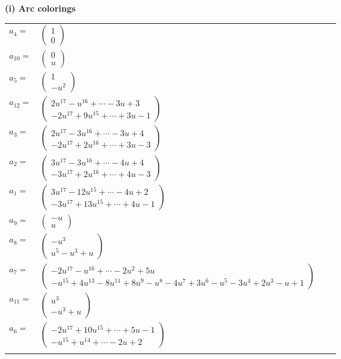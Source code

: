 \documentclass[1p]{elsarticle_modified}
\theoremstyle{definition}
\begin{document}
\flushleft \textbf{(i) Arc colorings}\\
\begin{tabular}{m{7pt} m{180pt} m{7pt} m{180pt} }
\flushright $a_{4}=$&$\begin{pmatrix}1\\0\end{pmatrix}$ \\
\flushright $a_{10}=$&$\begin{pmatrix}0\\u\end{pmatrix}$ \\
\flushright $a_{5}=$&$\begin{pmatrix}1\\- u^2\end{pmatrix}$ \\
\flushright $a_{12}=$&$\begin{pmatrix}2 u^{17}- u^{16}+\cdots-3 u+3\\-2 u^{17}+9 u^{15}+\cdots+3 u-1\end{pmatrix}$ \\
\flushright $a_{3}=$&$\begin{pmatrix}2 u^{17}-3 u^{16}+\cdots-3 u+4\\-2 u^{17}+2 u^{16}+\cdots+3 u-3\end{pmatrix}$ \\
\flushright $a_{2}=$&$\begin{pmatrix}3 u^{17}-3 u^{16}+\cdots-4 u+4\\-3 u^{17}+2 u^{16}+\cdots+4 u-3\end{pmatrix}$ \\
\flushright $a_{1}=$&$\begin{pmatrix}3 u^{17}-12 u^{15}+\cdots-4 u+2\\-3 u^{17}+13 u^{15}+\cdots+4 u-1\end{pmatrix}$ \\
\flushright $a_{9}=$&$\begin{pmatrix}- u\\u\end{pmatrix}$ \\
\flushright $a_{8}=$&$\begin{pmatrix}- u^3\\u^5- u^3+u\end{pmatrix}$ \\
\flushright $a_{7}=$&$\begin{pmatrix}-2 u^{17}- u^{16}+\cdots-2 u^2+5 u\\- u^{15}+4 u^{13}-8 u^{11}+8 u^9- u^8-4 u^7+3 u^6- u^5-3 u^4+2 u^3- u+1\end{pmatrix}$ \\
\flushright $a_{11}=$&$\begin{pmatrix}u^3\\- u^3+u\end{pmatrix}$ \\
\flushright $a_{6}=$&$\begin{pmatrix}-2 u^{17}+10 u^{15}+\cdots+5 u-1\\- u^{15}+u^{14}+\cdots-2 u+2\end{pmatrix}$\\&\end{tabular}
\end{document}
